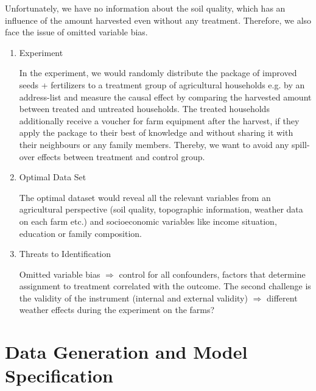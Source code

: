 Unfortunately, we have no information about the soil quality, which has an influence of the amount harvested even without any treatment. Therefore, we also face the issue of omitted variable bias. 


\begin{enumerate}
\item Experiment

In the experiment, we would randomly distribute the package of improved seeds + fertilizers to a treatment group of agricultural households e.g. by an address-list and measure the causal effect by comparing the harvested amount between treated and untreated households. The treated households additionally receive a voucher for farm equipment after the harvest, if they apply the package to their best of knowledge and without sharing it with their neighbours or any family members. Thereby, we want to avoid any spill-over effects between treatment and control group.

\item Optimal Data Set

The optimal dataset would reveal all the relevant variables from an agricultural perspective (soil quality, topographic information, weather data on each farm etc.) and socioeconomic variables like income situation, education or family composition.

\item Threats to Identification

Omitted variable bias $\Rightarrow$ control for all confounders, factors that determine assignment to treatment correlated with the outcome. The second challenge is the validity of the instrument (internal and external validity) $\Rightarrow$ different weather effects during the experiment on the farms?

\end{enumerate}

\section{Data Generation and Model Specification} \label{sec:data}

